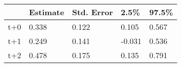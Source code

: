 \begin{tabular}{lllll}
  \toprule
  & Estimate & Std. Error & 2.5\% & 97.5\% \\ 
  \midrule
t+0 & 0.338 & 0.122 & 0.105 & 0.567 \\ 
  t+1 & 0.249 & 0.141 & -0.031 & 0.536 \\ 
  t+2 & 0.478 & 0.175 & 0.135 & 0.791 \\ 
   \bottomrule
\end{tabular}
